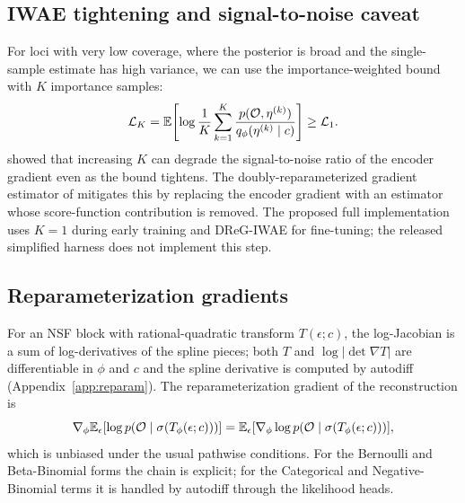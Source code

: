 \subsection{IWAE tightening and signal-to-noise caveat}
\label{ssec:iwae}
For loci with very low coverage, where the posterior is broad and the single-sample estimate has high variance, we can use the importance-weighted bound \citep{burda2016iwae} with $K$ importance samples:
\begin{equation}
\mathcal{L}_K = \mathbb{E}\!\left[\log\frac{1}{K}\sum_{k=1}^K \frac{p(\mathcal{O},\eta^{(k)})}{q_\phi(\eta^{(k)}\mid c)}\right] \ge \mathcal{L}_1.
\end{equation}
\citet{rainforth2018iwaeSNR} showed that increasing $K$ can degrade the signal-to-noise ratio of the encoder gradient even as the bound tightens. The doubly-reparameterized gradient estimator of \citet{tucker2019dreg} mitigates this by replacing the encoder gradient with an estimator whose score-function contribution is removed. The proposed full implementation uses $K=1$ during early training and DReG-IWAE for fine-tuning; the released simplified harness does not implement this step.

\subsection{Reparameterization gradients}
For an NSF block with rational-quadratic transform $T(\epsilon;c)$, the log-Jacobian is a sum of log-derivatives of the spline pieces; both $T$ and $\log|\det\nabla T|$ are differentiable in $\phi$ and $c$ and the spline derivative is computed by autodiff (Appendix~\ref{app:reparam}). The reparameterization gradient of the reconstruction is
\begin{equation}
\nabla_\phi \mathbb{E}_{\epsilon}[\log p(\mathcal{O}\mid\sigma(T_\phi(\epsilon;c)))] = \mathbb{E}_\epsilon[\nabla_\phi \log p(\mathcal{O}\mid\sigma(T_\phi(\epsilon;c)))],
\end{equation}
which is unbiased under the usual pathwise conditions. For the Bernoulli and Beta-Binomial forms the chain is explicit; for the Categorical and Negative-Binomial terms it is handled by autodiff through the likelihood heads.

